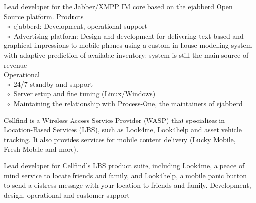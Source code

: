\documentclass[10pt,a4paper,final]{columncv}
\newcommand{\cvitembullet}{~$\circ$~}
\newcommand{\cvitempbullet}{\phantom{\cvitembullet}}
\begin{document}
\pagebreak

\begin{cvenv}
         {Lead developer for the Jabber/XMPP IM core based on the 
          \href{http://www.process-one.net/en/ejabberd/}{ejabberd} Open Source platform.}
         {Products \\
          \cvitembullet ejabberd: Development, operational support \\
          \cvitembullet Advertising platform: Design and development for delivering 
          \cvitempbullet text-based and graphical impressions to mobile phones using a 
          \cvitempbullet custom in-house modelling system with adaptive prediction of 
          \cvitempbullet available inventory; system is still the main source of revenue \\
          Operational \\
          \cvitembullet 24/7 standby and support \\
          \cvitembullet Server setup and fine tuning (Linux/Windows) \\
          \cvitembullet Maintaining the relationship with 
                   \href{http://www.process-one.net/en/}{Process-One}, the maintainers of 
          \cvitempbullet ejabberd}
\end{cvenv}

\noindent Cellfind is a Wireless Access Service Provider (WASP) that specialises in 
Location-Based Services (LBS), such as Look4me, Look4help and asset vehicle tracking. It 
also provides services for mobile content delivery (Lucky Mobile, Fresh Mobile and more). 
\begin{cvenv}
         {Lead developer for Cellfind's LBS product suite, including  
         \href{http://www.look4me.co.za/}{Look4me}, a peace of mind 
         service to locate friends and family, and  
         \href{http://www.look4help.co.za/}{Look4help}, a mobile panic 
         button to send a distress message with your location to friends and family.}
         {Development, design, operational and customer support}
\end{cvenv}

\end{document}
